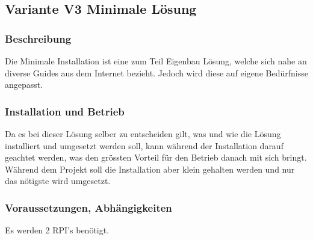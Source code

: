 \subsection{Variante V3 \flqq Minimale Lösung\frqq}
\subsubsection{Beschreibung}
Die Minimale Installation ist eine zum Teil Eigenbau Lösung, welche sich nahe an diverse Guides aus dem Internet bezieht. Jedoch wird diese auf eigene Bedürfnisse angepasst.

\subsubsection{Installation und Betrieb}
Da es bei dieser Lösung selber zu entscheiden gilt, was und wie die Lösung installiert und umgesetzt werden soll, kann während der Installation darauf geachtet werden, was den grössten Vorteil für den Betrieb danach mit sich bringt. Während dem Projekt soll die Installation aber klein gehalten werden und nur das nötigste wird umgesetzt. 

\subsubsection{Voraussetzungen, Abhängigkeiten}
Es werden 2 RPI's benötigt.